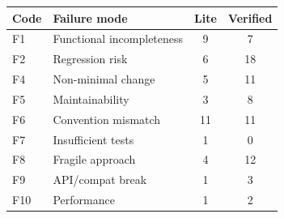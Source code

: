 \begin{tabular}{llcc}
\toprule
Code & Failure mode & Lite & Verified \\
\midrule
F1 & Functional incompleteness & 9 & 7 \\
F2 & Regression risk & 6 & 18 \\
F4 & Non-minimal change & 5 & 11 \\
F5 & Maintainability & 3 & 8 \\
F6 & Convention mismatch & 11 & 11 \\
F7 & Insufficient tests & 1 & 0 \\
F8 & Fragile approach & 4 & 12 \\
F9 & API/compat break & 1 & 3 \\
F10 & Performance & 1 & 2 \\
\bottomrule
\end{tabular}
